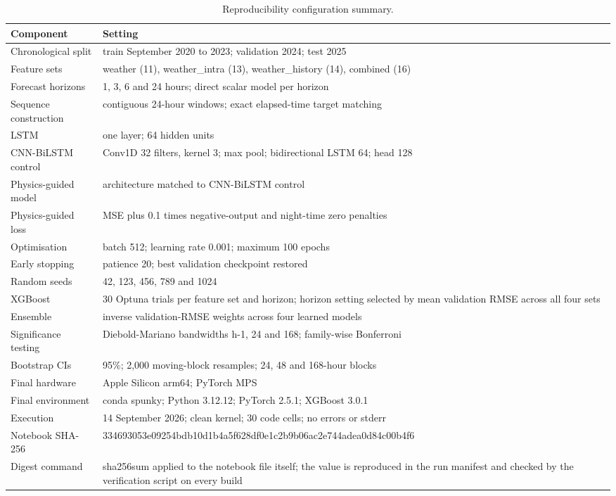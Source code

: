 \begin{table}[h!]
\centering
\caption{Reproducibility configuration summary.}
\label{tab:app_b1}
\footnotesize
\begin{tabularx}{\linewidth}{|l|X|}
\hline
\textbf{Component} & \textbf{Setting} \\
\hline
Chronological split & train September 2020 to 2023; validation 2024; test 2025 \\
Feature sets & weather (11), weather\_intra (13), weather\_history (14), combined (16) \\
Forecast horizons & 1, 3, 6 and 24 hours; direct scalar model per horizon \\
Sequence construction & contiguous 24-hour windows; exact elapsed-time target matching \\
LSTM & one layer; 64 hidden units \\
CNN-BiLSTM control & Conv1D 32 filters, kernel 3; max pool; bidirectional LSTM 64; head 128 \\
Physics-guided model & architecture matched to CNN-BiLSTM control \\
Physics-guided loss & MSE plus 0.1 times negative-output and night-time zero penalties \\
Optimisation & batch 512; learning rate 0.001; maximum 100 epochs \\
Early stopping & patience 20; best validation checkpoint restored \\
Random seeds & 42, 123, 456, 789 and 1024 \\
XGBoost & 30 Optuna trials per feature set and horizon; horizon setting selected by mean validation RMSE across all four sets \\
Ensemble & inverse validation-RMSE weights across four learned models \\
Significance testing & Diebold-Mariano bandwidths h-1, 24 and 168; family-wise Bonferroni \\
Bootstrap CIs & 95\%; 2,000 moving-block resamples; 24, 48 and 168-hour blocks \\
Final hardware & Apple Silicon arm64; PyTorch MPS \\
Final environment & conda spunky; Python 3.12.12; PyTorch 2.5.1; XGBoost 3.0.1 \\
Execution & 14 September 2026; clean kernel; 30 code cells; no errors or stderr \\
Notebook SHA-256 & 334693053e09254bdb10d1b4a5f628df\allowbreak{}0e1c2b9b06ac2e744adea0d84c00b4f6 \\
Digest command & sha256sum applied to the notebook file itself; the value is reproduced in the run manifest and checked by the verification script on every build \\
\hline
\end{tabularx}
\end{table}

